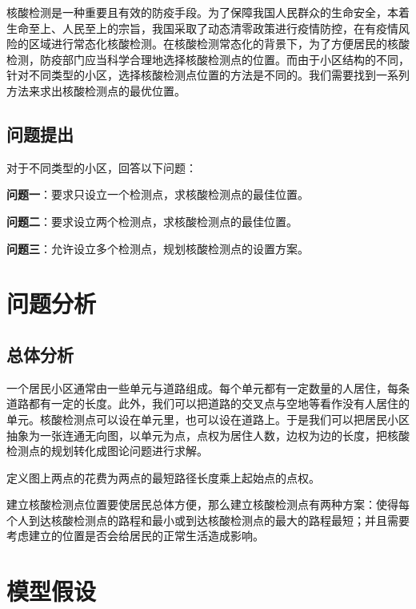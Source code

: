 \documentclass{cumcmthesis}
\begin{document}

核酸检测是一种重要且有效的防疫手段。为了保障我国人民群众的生命安全，本着生命至上、人民至上的宗旨，我国采取了动态清零政策进行疫情防控，在有疫情风险的区域进行常态化核酸检测。在核酸检测常态化的背景下，为了方便居民的核酸检测，防疫部门应当科学合理地选择核酸检测点的位置。而由于小区结构的不同，针对不同类型的小区，选择核酸检测点位置的方法是不同的。我们需要找到一系列方法来求出核酸检测点的最优位置。

\subsection{问题提出}

对于不同类型的小区，回答以下问题：

\textbf{问题一}：要求只设立一个检测点，求核酸检测点的最佳位置。

\textbf{问题二}：要求设立两个检测点，求核酸检测点的最佳位置。

\textbf{问题三}：允许设立多个检测点，规划核酸检测点的设置方案。

\section{问题分析}

\subsection{总体分析}

一个居民小区通常由一些单元与道路组成。每个单元都有一定数量的人居住，每条道路都有一定的长度。此外，我们可以把道路的交叉点与空地等看作没有人居住的单元。核酸检测点可以设在单元里，也可以设在道路上。于是我们可以把居民小区抽象为一张连通无向图，以单元为点，点权为居住人数，边权为边的长度，把核酸检测点的规划转化成图论问题进行求解。

定义图上两点的花费为两点的最短路径长度乘上起始点的点权。

建立核酸检测点位置要使居民总体方便，那么建立核酸检测点有两种方案：使得每个人到达核酸检测点的路程和最小或到达核酸检测点的最大的路程最短；并且需要考虑建立的位置是否会给居民的正常生活造成影响。

\section{模型假设}
\end{document}
